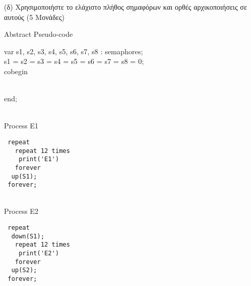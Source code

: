 \documentclass{article}
\begin{document}
\begin{itemize}
\item [(δ)]Χρησιμοποιήστε το ελάχιστο πλήθος σημαφόρων και ορθές αρχικοποιήσεις σε αυτούς (5 Μονάδες)

\begin{otherlanguage}{english}

        Abstract Pseudo-code
        
        var s1, s2, s3, s4, s5, s6, s7, s8 : semaphores;
        \\
        
        s1 = s2 = s3 = s4 = s5 = s6 = s7 = s8  = 0;
        \\          
        
       cobegin
      \\end;
      \\\begin{multicols}{2}
\\Process E1
\begin{lstlisting}
 repeat
   repeat 12 times
    print('E1')
   forever
  up(S1);
 forever;
\end{lstlisting}

\\Process E2
\begin{lstlisting}
 repeat
  down(S1);
   repeat 12 times
    print('E2')
   forever
  up(S2);
 forever;
\end{lstlisting}



\end{multicols}
\end{otherlanguage}
\end{itemize}
\end{document}
